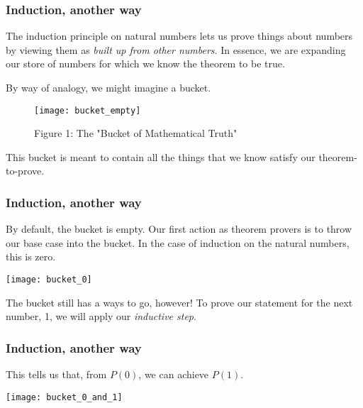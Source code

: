 \documentclass[aspectratio=169]{beamer}
\begin{document}

\begin{frame}[fragile]
  \frametitle{Induction, another way}

  The induction principle on natural numbers lets us prove things about numbers by
  viewing them as \textit{built up from other numbers}. In essence, we are expanding our
  store of numbers for which we know the theorem to be true.

  \pause
  \vspace{\fill}

  By way of analogy, we might imagine a bucket.

  \pause
  \begin{figure} 
    \centering
    \texttt{[image: bucket\_empty]} 
    \caption{Figure 1: The "Bucket of Mathematical Truth"\footnotemark}
  \end{figure}
  \pause
  This bucket is meant to contain all the things that we know satisfy our theorem-to-prove.
\end{frame}

\begin{frame}[fragile]
  \frametitle{Induction, another way}

  By default, the bucket is empty. Our first action as theorem provers is to throw our base case
  into the bucket. In the case of induction on the natural numbers, this is zero.

  \pause
  \vspace{\fill}
  
  \begin{center} 
    \texttt{[image: bucket\_0]} 
  \end{center}

  \pause
  \vspace{\fill}

  The bucket still has a ways to go, however! To prove our statement for the next number, 1, we
  will apply our \textit{inductive step}. 
\end{frame}

\begin{frame}[fragile]
  \frametitle{Induction, another way}

  This tells us that, from $P(0)$, we can achieve $P(1)$.

  \pause
  \vspace{\fill}

  \begin{center} \texttt{[image: bucket\_0\_and\_1]} \end{center}
\end{frame}
\end{document}
